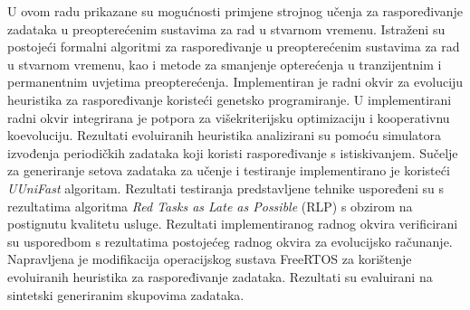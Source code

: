 \documentclass[utf8, diplomski, english, numeric]{fer}
\begin{document}
\newpage
\begin{sazetak}
U ovom radu prikazane su mogućnosti primjene strojnog učenja za raspoređivanje zadataka u preopterećenim sustavima za rad u stvarnom vremenu.
Istraženi su postojeći formalni algoritmi za raspoređivanje u preopterećenim sustavima za rad u stvarnom vremenu, kao i metode za smanjenje opterećenja u tranzijentnim i permanentnim uvjetima preopterećenja.
Implementiran je radni okvir za evoluciju heuristika za raspoređivanje koristeći genetsko programiranje.
U implementirani radni okvir integrirana je potpora za višekriterijsku optimizaciju i kooperativnu koevoluciju.
Rezultati evoluiranih heuristika analizirani su pomoću simulatora izvođenja periodičkih zadataka koji koristi raspoređivanje s istiskivanjem.
Sučelje za generiranje setova zadataka za učenje i testiranje implementirano je koristeći \textit{UUniFast} algoritam.
Rezultati testiranja predstavljene tehnike uspoređeni su s rezultatima algoritma \textit{Red Tasks as Late as Possible} (RLP) s obzirom na postignutu kvalitetu usluge.
Rezultati implementiranog radnog okvira verificirani su usporedbom s rezultatima postojećeg radnog okvira za evolucijsko računanje.
Napravljena je modifikacija operacijskog sustava FreeRTOS za korištenje evoluiranih heuristika za raspoređivanje zadataka.
Rezultati su evaluirani na sintetski generiranim skupovima zadataka.

\end{sazetak}
\end{document}
